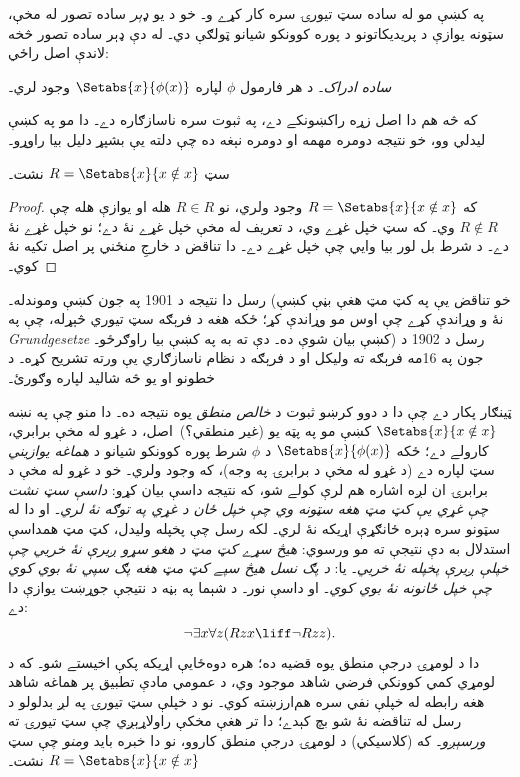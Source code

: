 \documentclass[../../../include/open-logic-section]{subfiles}
\begin{document}

په  کښې مو له ساده سټ تيورۍ سره کار
کړے و۔ خو د يو \emph{ډېر} ساده تصور له مخې، سټونه يوازې
د پريديکاتونو د پوره کوونکو شيانو ټولګې دي۔ له دې ډېر
ساده تصور څخه لاندې اصل راځي:

\begin{defish}
  \emph{ساده ادراک۔} د هر فارمول $\phi$ لپاره $\Setabs{x}{\phi(x)}$ وجود لري۔
\end{defish}

که څه هم دا اصل زړه راکښونکے دے، په ثبوت سره ناسازګاره دے۔
دا مو په  کښې ليدلي وو، خو نتيجه
دومره مهمه او دومره نېغه ده چې دلته يې بشپړ دليل بيا راوړو۔

\begin{thm}
سټ $R = \Setabs{x}{x \notin x}$ نشت۔
\end{thm}

\begin{proof}
که $R = \Setabs{x}{x \notin x}$ وجود ولري، نو
$R \in R$ هله او يوازې هله چې $R \notin R$ وي۔
که سټ خپل غړے وي، د تعريف له مخې خپل غړے نۀ دے؛ نو خپل
غړے نۀ دے۔ د شرط بل لور بيا وايي چې خپل غړے دے۔ دا تناقض
د خارجِ منځني پر اصل تکيه نۀ کوي۔
\end{proof}

رسل دا نتيجه د 1901 په جون کښې وموندله۔ (خو تناقض يې په
کټ مټ هغې بڼې کښې نۀ و وړاندې کړے چې اوس مو وړاندې کړ؛ ځکه
هغه د فرېګه سټ تيوري څېړله، چې په \emph{Grundgesetze} کښې
بيان شوې ده۔ دې ته به په  کښې بيا راوګرځو۔)
رسل د 1902 د جون په 16مه فرېګه ته وليکل او د فرېګه د نظام
ناسازګاري يې ورته تشريح کړه۔ د خطونو او يو څه شاليد لپاره
\citet[pp.~124--8]{Heijenoort1967} وګورئ۔

ټينګار پکار دے چې دا د دوو کرښو ثبوت د \emph{خالص منطق}
يوه نتيجه ده۔ دا منو چې په نښه $\Setabs{x}{x \notin x}$ کښې
مو په پټه يو (غير منطقي؟)\ اصل، د غړو له مخې برابري، کارولے
دے؛ ځکه $\Setabs{x}{\phi(x)}$ د $\phi$ شرط پوره کوونکو شيانو د \emph{هماغه يوازيني}
سټ لپاره دے (د غړو له مخې د برابرۍ په وجه)، که وجود ولري۔ خو
د غړو له مخې د برابرۍ ان لږه اشاره هم لرې کولے شو، که نتيجه
داسې بيان کړو: \emph{داسې سټ نشت چې غړي يې کټ مټ هغه سټونه
وي چې خپل ځان د غړي په توګه نۀ لري}۔ او دا له سټونو سره ډېره
ځانګړې اړيکه نۀ لري۔ لکه رسل چې پخپله وليدل، کټ مټ همداسې
استدلال به دې نتيجې ته مو ورسوي: \emph{هيڅ سړے کټ مټ د هغو
سړو ږيرې نۀ خريي چې خپلې ږيرې پخپله نۀ خريي}۔ يا:
\emph{د پګ نسل هيڅ سپے کټ مټ هغه پګ سپي نۀ بوي کوي چې خپل
ځانونه نۀ بوي کوي}۔ او داسې نور۔ د شېما په بڼه د نتيجې جوړښت
يوازې دا دے:
\[
\lnot \exists x \forall z(Rzx \liff \lnot R zz).
\]
دا د لومړۍ درجې منطق يوه قضيه ده؛ هره دوه‌ځايې اړيکه
پکې اخيستے شو۔ که د لومړي کمي کوونکي فرضي شاهد موجود وي، د
عمومي مادې تطبيق پر هماغه شاهد هغه رابطه له خپلې نفي سره
هم‌ارزښته کوي۔ نو
د خپلې سټ تيورۍ په لږ بدلولو د رسل له تناقضه نۀ شو بچ کېدے؛
دا تر هغې مخکې راولاړېږي چې سټ تيورۍ ته \emph{ورسېږو}۔ که
(کلاسيکي) د لومړۍ درجې منطق کاروو، نو دا خبره بايد
\emph{ومنو} چې سټ $R = \Setabs{x}{x\notin x}$ نشت۔
\end{document}
